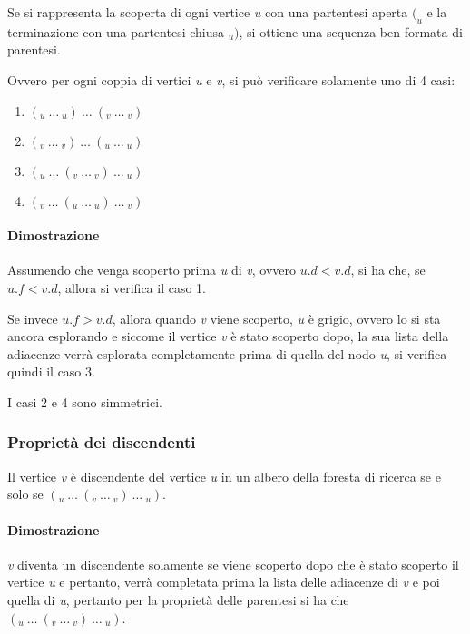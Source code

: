 Se si rappresenta la scoperta di ogni vertice \emph{u} con una
partentesi aperta $(_u$ e la terminazione con una partentesi chiusa
$_u)$, si ottiene una sequenza ben formata di parentesi.

Ovvero per ogni coppia di vertici \emph{u} e \emph{v}, si può verificare
solamente uno di 4 casi:

\begin{enumerate}
\item
  $(_u \: \ldots\: _u) \: \ldots \: (_v \:\ldots \:_v)$
\item
  $(_v  \: \ldots \: _v) \: \ldots \: (_u \:\ldots \:_u)$
\item
  $(_u \: \ldots \: (_v \: \ldots \:_v) \: \ldots \:_u)$
\item
  $(_v \: \ldots \: (_u \: \ldots \: _u)\: \ldots \:_v)$
\end{enumerate}

\paragraph{Dimostrazione}\label{dimostrazione}

Assumendo che venga scoperto prima \emph{u} di \emph{v}, ovvero
$u.d < v.d$, si ha che, se $u.f < v.d$,
allora si verifica il caso 1.

Se invece $u.f > v.d$, allora quando \emph{v} viene
scoperto, \emph{u} è grigio, ovvero lo si sta ancora esplorando e
siccome il vertice \emph{v} è stato scoperto dopo, la sua lista della
adiacenze verrà esplorata completamente prima di quella del nodo
\emph{u}, si verifica quindi il caso 3.

I casi 2 e 4 sono simmetrici.

\subsubsection{Proprietà dei discendenti}\label{proprietuxe0-dei-discendenti}

Il vertice \emph{v} è discendente del vertice \emph{u} in un albero
della foresta di ricerca se e solo se $(_u \: \ldots \: (_v \: \ldots \:_v) \: \ldots \:_u)$.

\paragraph{Dimostrazione}\label{dimostrazione-1}

\emph{v} diventa un discendente solamente se viene scoperto dopo che è
stato scoperto il vertice \emph{u} e pertanto, verrà completata prima la
lista delle adiacenze di \emph{v} e poi quella di \emph{u}, pertanto per
la proprietà delle parentesi si ha che $(_u \: \ldots \: (_v \: \ldots \:_v) \: \ldots \:_u)$.

